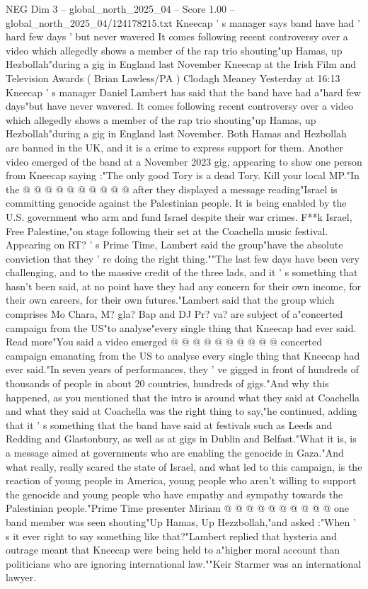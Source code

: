 \begin{textsample}{NEG Dim 3 – global\_north\_2025\_04 – Score 1.00 – global\_north\_2025\_04/124178215.txt}  \label{ex:f3_neg_410}
Kneecap ' s manager says band have had ' hard few days ' but never wavered It comes following recent controversy over a video which allegedly shows a member of the rap trio shouting"up Hamas, up Hezbollah"during a gig in England last November Kneecap at the Irish Film and Television Awards ( Brian Lawless/PA ) Clodagh Meaney Yesterday at 16:13 Kneecap ' s manager Daniel Lambert has said that the band have had a"hard few days"but have never wavered.
It comes following recent controversy over a video which allegedly shows a member of the rap trio shouting"up Hamas, up Hezbollah"during a gig in England last November.
Both Hamas and Hezbollah are banned in the UK, and it is a crime to express support for them.
Another video emerged of the band at a November 2023 gig, appearing to show one person from Kneecap saying :"The only good Tory is a dead Tory.
Kill your local MP."In the @ @ @ @ @ @ @ @ @ @ after they displayed a message reading"Israel is committing genocide against the Palestinian people.
It is being enabled by the U.S. government who arm and fund Israel despite their war crimes.
F**k Israel, Free Palestine,"on stage following their set at the Coachella music festival.
Appearing on RT? ' s Prime Time, Lambert said the group"have the absolute conviction that they ' re doing the right thing.""The last few days have been very challenging, and to the massive credit of the three lads, and it ' s something that hasn't been said, at no point have they had any concern for their own income, for their own careers, for their own futures."Lambert said that the group which comprises Mo Chara, M? gla?
Bap and DJ Pr? va? are subject of a"concerted campaign from the US"to analyse"every single thing that Kneecap had ever said.
Read more"You said a video emerged @ @ @ @ @ @ @ @ @ @ concerted campaign emanating from the US to analyse every single thing that Kneecap had ever said."In seven years of performances, they ' ve gigged in front of hundreds of thousands of people in about 20 countries, hundreds of gigs."And why this happened, as you mentioned that the intro is around what they said at Coachella and what they said at Coachella was the right thing to say,"he continued, adding that it ' s something that the band have said at festivals such as Leeds and Redding and Glastonbury, as well as at gigs in Dublin and Belfast."What it is, is a message aimed at governments who are enabling the genocide in Gaza."And what really, really scared the state of Israel, and what led to this campaign, is the reaction of young people in America, young people who aren't willing to support the genocide and young people who have empathy and sympathy towards the Palestinian people."Prime Time presenter Miriam @ @ @ @ @ @ @ @ @ @ one band member was seen shouting"Up Hamas, Up Hezzbollah,"and asked :"When ' s it ever right to say something like that?"Lambert replied that hysteria and outrage meant that Kneecap were being held to a"higher moral account than politicians who are ignoring international law.""Keir Starmer was an international lawyer.

\end{textsample}
